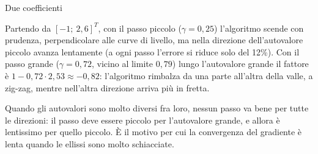 \begin{esempio}{Due coefficienti}
\begin{center}
\hspace{0.3cm}
\begin{minipage}[b]{5.6cm}\small
Partendo da $[-1;\ 2{,}6]^T$, con il passo piccolo ($\gamma = 0{,}25$) l'algoritmo scende con prudenza, perpendicolare
alle curve di livello, ma nella direzione dell'autovalore piccolo avanza lentamente (a ogni passo l'errore si riduce
solo del 12\%). Con il passo grande ($\gamma = 0{,}72$, vicino al limite $0{,}79$) lungo l'autovalore grande il fattore
è $1 - 0{,}72 \cdot 2{,}53 \approx -0{,}82$: l'algoritmo rimbalza da una parte all'altra della valle, a zig-zag, mentre
nell'altra direzione arriva più in fretta.
\vspace{0.4cm}
\end{minipage}
\end{center}
Quando gli autovalori sono molto diversi fra loro, nessun passo va bene per tutte le direzioni: il passo deve essere
piccolo per l'autovalore grande, e allora è lentissimo per quello piccolo. È il motivo per cui la convergenza del
gradiente è lenta quando le ellissi sono molto schiacciate.
\end{esempio}


